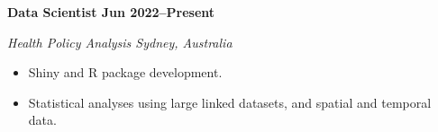 \textbf{Data Scientist \hfill Jun 2022--Present}\par
\textit{Health Policy Analysis \hfill Sydney, Australia}\par
\begin{itemize}
	\item Shiny and R package development.
	\item Statistical analyses using large linked datasets, and spatial and temporal data.
\end{itemize}\par